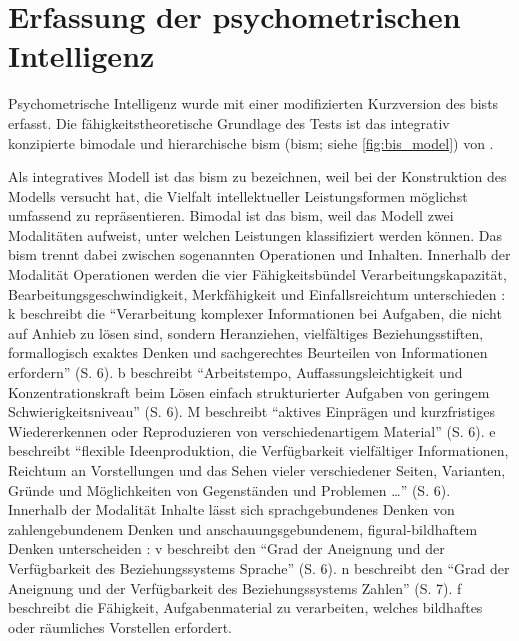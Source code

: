 \documentclass[11pt, twoside, a4paper]{book}		%
\begin{document}
\section{Erfassung der psychometrischen Intelligenz \label{sec:Erfassung_der_psychometrischen_Intelligenz}}


Psychometrische Intelligenz wurde mit einer modifizierten Kurzversion des \acrlong{bist}s \citep[\gls{bist};][]{Jaeger1997} erfasst. Die fähigkeitstheoretische Grundlage des Tests ist das integrativ konzipierte bimodale und hierarchische \acrlong{bism} (\gls{bism}; siehe \autoref{fig:bis_model}) von \citet{Jaeger1984}.

Als integratives Modell ist das \gls{bism} zu bezeichnen, weil \citet{Jaeger1984} bei der Konstruktion des Modells versucht hat, die Vielfalt intellektueller Leistungsformen möglichst umfassend zu repräsentieren.
Bimodal ist das \gls{bism}, weil das Modell zwei Modalitäten aufweist, unter welchen Leistungen klassifiziert werden können. 
Das \gls{bism} trennt dabei zwischen sogenannten Operationen und Inhalten. Innerhalb der Modalität Operationen werden die vier Fähigkeitsbündel Verarbeitungskapazität, Bearbeitungsgeschwindigkeit, Merkfähigkeit und Einfallsreichtum unterschieden \citep[]{Jaeger1997}:
\gls{k} beschreibt die \enquote{Verarbeitung komplexer Informationen bei Aufgaben, die nicht auf Anhieb zu lösen sind, sondern Heranziehen, vielfältiges Beziehungsstiften, formallogisch exaktes Denken und sachgerechtes Beurteilen von Informationen erfordern} (S. 6).
\gls{b} beschreibt \enquote{Arbeitstempo, Auffassungsleichtigkeit und Konzentrationskraft beim Lösen einfach strukturierter Aufgaben von geringem Schwierigkeitsniveau} (S. 6).
\gls{M} beschreibt \enquote{aktives Einprägen und kurzfristiges Wiedererkennen oder Reproduzieren von verschiedenartigem Material} (S. 6).
\gls{e} beschreibt \enquote{flexible Ideenproduktion, die Verfügbarkeit vielfältiger Informationen, Reichtum an Vorstellungen und das Sehen vieler verschiedener Seiten, Varianten, Gründe und Möglichkeiten von Gegenständen und Problemen \ldots} (S. 6).
Innerhalb der Modalität Inhalte lässt sich sprachgebundenes Denken von zahlengebundenem Denken und anschauungsgebundenem, figural-bildhaftem Denken unterscheiden \citep{Jaeger1997}:
\Gls{v} beschreibt den \enquote{Grad der Aneignung und der Verfügbarkeit des Beziehungssystems Sprache} (S. 6).
\Gls{n} beschreibt den \enquote{Grad der Aneignung und der Verfügbarkeit des Beziehungssystems Zahlen} (S. 7).
\Gls{f} beschreibt die Fähigkeit, Aufgabenmaterial zu verarbeiten, welches bildhaftes oder räumliches Vorstellen erfordert.
\end{document}
